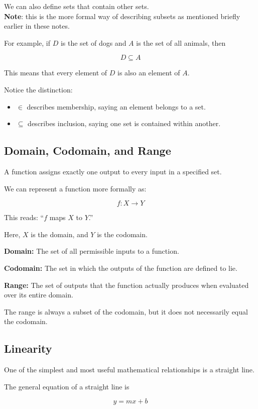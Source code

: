 \documentclass[12pt]{article}
\begin{document}
We can also define sets that contain other sets. \\
\textbf{Note}: this is the more formal way of describing subsets as mentioned briefly earlier in these notes.

For example, if $D$ is the set of dogs and $A$ is the set of all animals, then

\[
D\subseteq A
\]

This means that every element of $D$ is also an element of $A$. 

Notice the distinction:
\begin{itemize}
    \item $\in$ describes membership, saying an element belongs to a set.
    \item $\subseteq$ describes inclusion, saying one set is contained within another.
\end{itemize}

\subsection{Domain, Codomain, and Range}

A function assigns exactly one output to every input in a specified set.

We can represent a function more formally as:

\[
f:X\rightarrow Y
\]

This reads: ``$f$ maps $X$ to $Y$.''

Here, $X$ is the domain, and $Y$ is the codomain.

\textbf{Domain:} The set of all permissible inputs to a function.

\textbf{Codomain:} The set in which the outputs of the function are defined to lie.

\textbf{Range:} The set of outputs that the function actually produces when evaluated over its entire domain.

The range is always a subset of the codomain, but it does not necessarily equal the codomain.

\subsection{Linearity}

One of the simplest and most useful mathematical relationships is a straight line.

The general equation of a straight line is

\[
\boxed{y=mx+b}
\]
\end{document}
